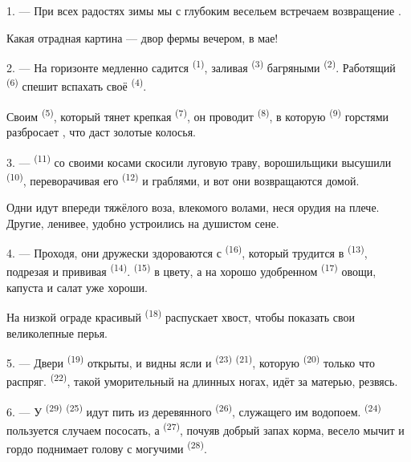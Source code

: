 1. --- При всех радостях зимы мы с глубоким весельем встречаем возвращение
.

Какая отрадная картина --- двор фермы вечером, в мае!

2. --- На горизонте медленно садится  \textsuperscript{(1)}, заливая
 \textsuperscript{(3)} багряными  \textsuperscript{(2)}.
Работящий  \textsuperscript{(6)} спешит вспахать своё
 \textsuperscript{(4)}.

Своим  \textsuperscript{(5)}, который тянет крепкая 
\textsuperscript{(7)}, он проводит  \textsuperscript{(8)}, в которую
 \textsuperscript{(9)} горстями разбросает , что
даст золотые колосья.

3. ---  \textsuperscript{(11)} со своими косами скосили луговую
траву, ворошильщики высушили  \textsuperscript{(10)}, переворачивая
его  \textsuperscript{(12)} и граблями, и вот они возвращаются
домой.

Одни идут впереди тяжёлого воза, влекомого волами, неся орудия на плече.
Другие, ленивее, удобно устроились на душистом сене.

4. --- Проходя, они дружески здороваются с 
\textsuperscript{(16)}, который трудится в  \textsuperscript{(13)},
подрезая  и прививая 
\textsuperscript{(14)}.  \textsuperscript{(15)} в цвету, а на хорошо
удобренном  \textsuperscript{(17)} овощи, капуста и салат уже
хороши.

На низкой ограде красивый  \textsuperscript{(18)} распускает
хвост, чтобы показать свои великолепные перья.

\VUsaut{3.0mm}

5. --- Двери  \textsuperscript{(19)} открыты, и видны ясли и
 \textsuperscript{(23)}  \textsuperscript{(21)},
которую  \textsuperscript{(20)} только что распряг.
 \textsuperscript{(22)}, такой уморительный на длинных ногах,
идёт за матерью, резвясь.

6. --- У  \textsuperscript{(29)}  \textsuperscript{(25)}
идут пить из деревянного  \textsuperscript{(26)}, служащего им
водопоем.  \textsuperscript{(24)} пользуется случаем пососать, а
 \textsuperscript{(27)}, почуяв добрый запах корма, весело мычит и
гордо поднимает голову с могучими  \textsuperscript{(28)}.

